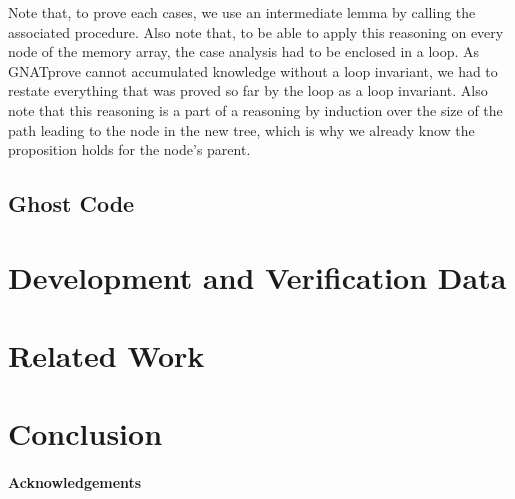 \documentclass[11pt,a4paper]{article}
\begin{document}
Note that, to prove each cases, we use an intermediate lemma by calling the associated procedure.
Also note that, to be able to apply this reasoning on every node of the memory array, the case
analysis had to be enclosed in a loop. As GNATprove cannot accumulated knowledge without a loop
invariant, we had to restate everything that was proved so far by the loop as a loop invariant.
Also note that this reasoning is a part of a reasoning by induction over the size of the path
leading to the node in the new tree, which is why we already know the proposition holds for the
node's parent.

\subsection{Ghost Code}



\section{Development and Verification Data}

\section{Related Work}
\label{related-work}

\section{Conclusion}


\paragraph*{Acknowledgements}




\end{document}
